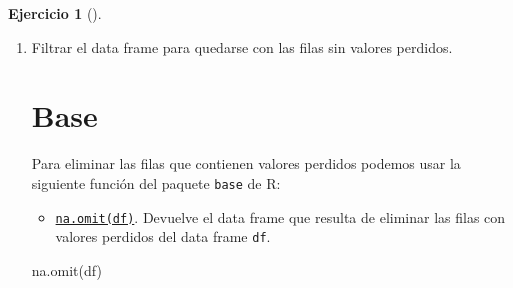 \documentclass[
  a4paper,
]{scrreport}
\newenvironment{Shaded}{\begin{snugshade}}{\end{snugshade}}
\newcommand{\ExtensionTok}[1]{\textcolor[rgb]{0.00,0.23,0.31}{#1}}
\newcommand{\FunctionTok}[1]{\textcolor[rgb]{0.28,0.35,0.67}{#1}}
\newcommand{\NormalTok}[1]{\textcolor[rgb]{0.00,0.23,0.31}{#1}}
\providecommand{\tightlist}{%
  \setlength{\itemsep}{0pt}\setlength{\parskip}{0pt}}\usepackage{longtable,booktabs,array}
\theoremstyle{definition}
\newtheorem{exercise}{Ejercicio}[chapter]
\theoremstyle{remark}
\begin{document}
\begin{exercise}[]
\begin{enumerate}
\begin{tcolorbox}
  \section{Copilot}

\begin{Shaded}
\begin{Highlighting}[]
\ExtensionTok{Filtrar}\NormalTok{ el data frame para quedarse con las filas en las que la columna sexo contenga el valor H y la columna edad contenga un valor mayor que 30.}
\end{Highlighting}
\end{Shaded}

  \end{tcolorbox}
\item
  Filtrar el data frame para quedarse con las filas sin valores
  perdidos.

  \begin{tcolorbox}[enhanced jigsaw, colframe=quarto-callout-tip-color-frame, toprule=.15mm, bottomtitle=1mm, breakable, opacitybacktitle=0.6, toptitle=1mm, colback=white, bottomrule=.15mm, title=\textcolor{quarto-callout-tip-color}{\faLightbulb}\hspace{0.5em}{Solución}, arc=.35mm, left=2mm, titlerule=0mm, rightrule=.15mm, coltitle=black, leftrule=.75mm, opacityback=0, colbacktitle=quarto-callout-tip-color!10!white]

  \section{Base}

  Para eliminar las filas que contienen valores perdidos podemos usar la
  siguiente función del paquete \texttt{base} de R:

  \begin{itemize}
  \tightlist
  \item
    \href{https://rdrr.io/r/stats/na.fail.html}{\texttt{na.omit(df)}}.
    Devuelve el data frame que resulta de eliminar las filas con valores
    perdidos del data frame \texttt{df}.
  \end{itemize}

\begin{Shaded}
\begin{Highlighting}[]
\FunctionTok{na.omit}\NormalTok{(df)}
\end{Highlighting}
\end{Shaded}


\end{tcolorbox}
\end{enumerate}
\end{exercise}
\end{document}
